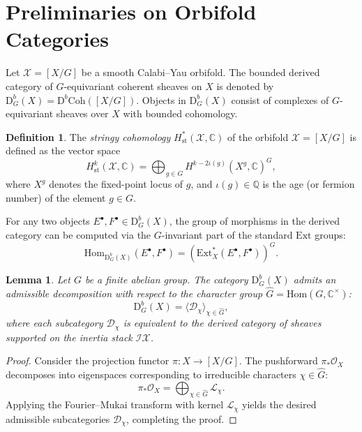 \documentclass[12pt,reqno]{amsart}
\theoremstyle{plain}
\newtheorem{lemma}[theorem]{Lemma}
\theoremstyle{definition}
\newtheorem{definition}[theorem]{Definition}
\theoremstyle{remark}
\newcommand{\cO}{\mathcal{O}}
\newcommand{\cX}{\mathcal{X}}
\newcommand{\cD}{\mathcal{D}}
\newcommand{\Db}{\mathrm{D}^b}
\newcommand{\Ext}{\mathrm{Ext}}
\newcommand{\Hom}{\mathrm{Hom}}
\newcommand{\Coh}{\mathrm{Coh}}
\newcommand{\CC}{\mathbb{C}}
\newcommand{\QQ}{\mathbb{Q}}
\numberwithin{equation}{section}
\begin{document}
\section{Preliminaries on Orbifold Categories}
\label{sec:prelim}

Let $\cX = [X/G]$ be a smooth Calabi--Yau orbifold. The bounded derived category of $G$-equivariant coherent sheaves on $X$ is denoted by $\Db_G(X) = \Db\Coh([X/G])$. Objects in $\Db_G(X)$ consist of complexes of $G$-equivariant sheaves over $X$ with bounded cohomology.

\begin{definition}
\label{def:stringy-cohomology}
The \emph{stringy cohomology} $H^*_{\mathrm{st}}(\cX, \CC)$ of the orbifold $\cX = [X/G]$ is defined as the vector space
\begin{equation}
H^k_{\mathrm{st}}(\cX, \CC) = \bigoplus_{g \in G} H^{k - 2\iota(g)}(X^g, \CC)^G,
\end{equation}
where $X^g$ denotes the fixed-point locus of $g$, and $\iota(g) \in \QQ$ is the age (or fermion number) of the element $g \in G$.
\end{definition}

For any two objects $E^\bullet, F^\bullet \in \Db_G(X)$, the group of morphisms in the derived category can be computed via the $G$-invariant part of the standard $\Ext$ groups:
\begin{equation}
\Hom_{\Db_G(X)}(E^\bullet, F^\bullet) = \left( \Ext^*_X(E^\bullet, F^\bullet) \right)^G.
\end{equation}

\begin{lemma}
\label{lem:semiorthogonal}
Let $G$ be a finite abelian group. The category $\Db_G(X)$ admits an admissible decomposition with respect to the character group $\hat{G} = \Hom(G, \CC^\times)$:
\begin{equation}
\Db_G(X) = \langle \cD_\chi \rangle_{\chi \in \hat{G}},
\end{equation}
where each subcategory $\cD_\chi$ is equivalent to the derived category of sheaves supported on the inertia stack $\mathcal{I}\cX$.
\end{lemma}

\begin{proof}
Consider the projection functor $\pi \colon X \to [X/G]$. The pushforward $\pi_* \cO_X$ decomposes into eigenspaces corresponding to irreducible characters $\chi \in \hat{G}$:
\begin{equation}
\pi_* \cO_X = \bigoplus_{\chi \in \hat{G}} \mathcal{L}_\chi.
\end{equation}
Applying the Fourier--Mukai transform with kernel $\mathcal{L}_\chi$ yields the desired admissible subcategories $\cD_\chi$, completing the proof.
\end{proof}
\end{document}
